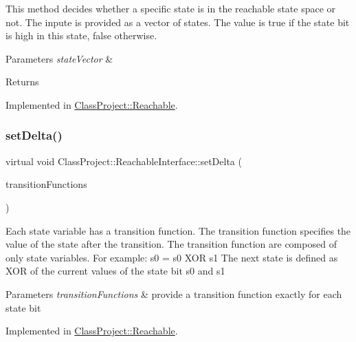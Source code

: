This method decides whether a specific state is in the reachable state space or not. The inpute is provided as a vector of states. The value is true if the state bit is high in this state, false otherwise. 
\begin{DoxyParams}{Parameters}
{\em state\+Vector} & \\
\hline
\end{DoxyParams}
\begin{DoxyReturn}{Returns}

\end{DoxyReturn}


Implemented in \hyperlink{classClassProject_1_1Reachable_a19a40b477fc119690e0a9f1f7ffc4843}{Class\+Project\+::\+Reachable}.

\mbox{\label{classClassProject_1_1ReachableInterface_a88f9a34f7272c3f971e757aa2b140746}} 
\subsubsection{\texorpdfstring{set\+Delta()}{setDelta()}}
{\footnotesize\ttfamily virtual void Class\+Project\+::\+Reachable\+Interface\+::set\+Delta (\begin{DoxyParamCaption}\item[{const std\+::vector$<$ B\+D\+D\+\_\+\+ID $>$ \&}]{transition\+Functions }\end{DoxyParamCaption})\hspace{0.3cm}{\ttfamily [pure virtual]}}

Each state variable has a transition function. The transition function specifies the value of the state after the transition. The transition function are composed of only state variables. For example\+: s0\textquotesingle{} = s0 X\+OR s1 The next state is defined as X\+OR of the current values of the state bit s0 and s1 
\begin{DoxyParams}{Parameters}
{\em transition\+Functions} & provide a transition function exactly for each state bit \\
\hline
\end{DoxyParams}


Implemented in \hyperlink{classClassProject_1_1Reachable_a53fdcc94c37cd7f0e27881678189b5c5}{Class\+Project\+::\+Reachable}.

